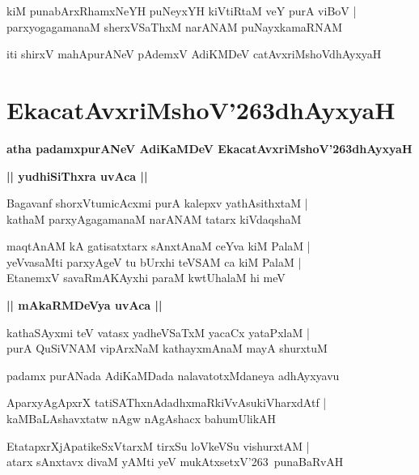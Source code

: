 \documentclass[twoside,12pt,openright]{book}
\def\S{\char'263}
\newcounter{shloka}[chapter]
\def\uvaca#1{\centerline{{\large\textbf{#1}}}}
\begin{document}
\begin{shloka}
kiM punabArxRhamxNeYH puNeyxYH kiVtiRtaM veY purA viBoV |\\
parxyogagamanaM sherxVSaThxM narANAM puNayxkamaRNAM 
\end{shloka}

\begin{center}
iti shirxV mahApurANeV pAdemxV AdiKMDeV catAvxriMshoVdhAyxyaH
\end{center}

\chapter{EkacatAvxriMshoV\S dhAyxyaH}

\begin{center}
{\LARGE\bfseries atha padamxpurANeV AdiKaMDeV EkacatAvxriMshoV\S dhAyxyaH}
\end{center}

\uvaca{ || yudhiSiThxra uvAca ||}

\begin{shloka}
Bagavanf shorxVtumicAcxmi purA kalepxv yathAsithxtaM |\\
kathaM parxyAgagamanaM narANAM tatarx kiVdaqshaM 
\end{shloka}

\begin{shloka}
maqtAnAM kA gatisatxtarx sAnxtAnaM ceYva kiM PalaM |\\
yeVvasaMti parxyAgeV tu bUrxhi teVSAM ca kiM PalaM |\\
EtanemxV savaRmAKAyxhi paraM kwtUhalaM hi meV 
\end{shloka}

\uvaca{|| mAkaRMDeVya uvAca ||}

\begin{shloka}
kathaSAyxmi teV vatasx yadheVSaTxM yacaCx yataPxlaM |\\
purA QuSiVNAM vipArxNaM kathayxmAnaM mayA shurxtuM 
\end{shloka}

\begin{center}
padamx purANada AdiKaMDada nalavatotxMdaneya adhAyxyavu 
\end{center}

\begin{shloka}
AparxyAgApxrX tatiSAThxnAdadhxmaRkiVvAsukiVharxdAtf |\\
kaMBaLAshavxtatw nAgw nAgAshacx bahumUlikAH
\end{shloka}

\begin{shloka}
EtatapxrXjApatikeSxVtarxM tirxSu loVkeVSu vishurxtAM |\\
atarx sAnxtavx divaM yAMti yeV mukAtxsetxV\S ~punaBaRvAH 
\end{shloka}
\end{document}
